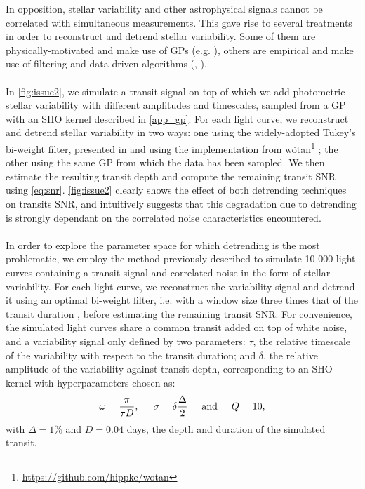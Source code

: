 \documentclass[modern]{aastex631}
\begin{document}
In opposition, stellar variability and other astrophysical signals cannot be correlated with simultaneous measurements. This gave rise to several treatments in order to reconstruct and detrend stellar variability. Some of them are physically-motivated and make use of GPs (e.g. \citealt{k2sc}), others are empirical and make use of filtering and data-driven algorithms (\citealt{Jenkins2010}, \citealt{wotan}).\\\\
In \autoref{fig:issue2}, we simulate a transit signal on top of which we add photometric stellar variability with different amplitudes and timescales, sampled from a GP with an SHO kernel described in \autoref{app_gp}. For each light curve, we reconstruct and detrend stellar variability in two ways: one using the widely-adopted Tukey's bi-weight filter, presented in \cite{tukey} and using the implementation from \textsf{wõtan}\footnote{\href{https://github.com/hippke/wotan}{https://github.com/hippke/wotan}} \citep{wotan}; the other using the same GP from which the data has been sampled. We then estimate the resulting transit depth and compute the remaining transit SNR using \autoref{eq:snr}. \autoref{fig:issue2} clearly shows the effect of both detrending techniques on transits SNR, and intuitively suggests that this degradation due to detrending is strongly dependant on the correlated noise characteristics encountered.\\\\
In order to explore the parameter space for which detrending is the most problematic, we employ the method previously described to simulate 10 000 light curves containing a transit signal and correlated noise in the form of stellar variability. For each light curve, we reconstruct the variability signal and detrend it using an optimal bi-weight filter, i.e. with a window size three times that of the transit duration \citep{wotan}, before estimating the remaining transit SNR. For convenience, the simulated light curves share a common transit added on top of white noise, and a variability signal only defined by two parameters: $\tau$, the relative timescale of the variability with respect to the transit duration; and $\delta$, the relative amplitude of the variability against transit depth, corresponding to an SHO kernel with hyperparameters chosen as: 
\begin{equation}\label{eq:relative_params}
    \omega = \frac{\pi}{\tau D}, \hspace{0.5cm} 
    \sigma = \delta \frac{\Delta}{2} \hspace{0.5cm}  \text{and}  \hspace{0.5cm}  
    Q = 10,
\end{equation}
with $\Delta=1\%$ and $D=0.04$ days, the depth and duration of the simulated transit. 
\end{document}
